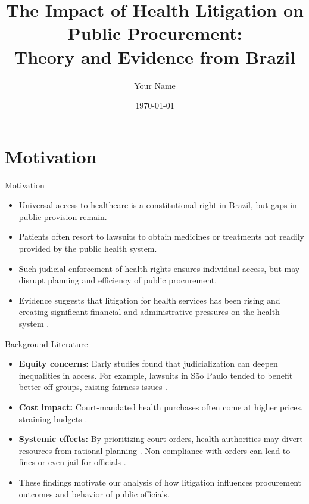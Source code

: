 \documentclass{beamer}
\title{The Impact of Health Litigation on Public Procurement:\\ Theory and Evidence from Brazil}
\author{Your Name}
\institute{Your Institution}
\date{\today}
\begin{document}
\begin{frame}
  \titlepage
\end{frame}


\section{Motivation}

\begin{frame}{Motivation}
\begin{itemize}
  \item Universal access to healthcare is a constitutional right in Brazil, but gaps in public provision remain.
  \item Patients often resort to lawsuits to obtain medicines or treatments not readily provided by the public health system.
  \item Such judicial enforcement of health rights ensures individual access, but may disrupt planning and efficiency of public procurement.
  \item Evidence suggests that litigation for health services has been rising and creating significant financial and administrative pressures on the health system \citep{Vieira2007, TCU2017}.
\end{itemize}
\end{frame}

\begin{frame}{Background Literature}
\begin{itemize}
  \item \textbf{Equity concerns:} Early studies found that judicialization can deepen inequalities in access. For example, lawsuits in S\~ao Paulo tended to benefit better-off groups, raising fairness issues \citep{Chieffi2009}.
  \item \textbf{Cost impact:} Court-mandated health purchases often come at higher prices, straining budgets \citep{Vieira2007, Chieffi2009}.
  \item \textbf{Systemic effects:} By prioritizing court orders, health authorities may divert resources from rational planning \citep{Vargas2019}. Non-compliance with orders can lead to fines or even jail for officials \citep{Delduque2013}.
  \item These findings motivate our analysis of how litigation influences procurement outcomes and behavior of public officials.
\end{itemize}
\end{frame}
\end{document}
